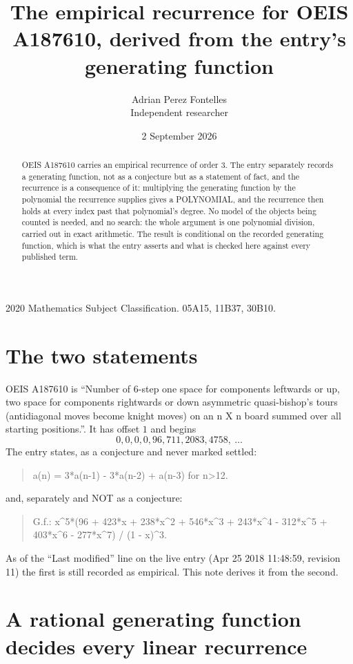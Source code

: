 \documentclass[11pt,a4paper]{article}
\title{The empirical recurrence for OEIS A187610, derived from the entry's generating function}
\author{Adrian Perez Fontelles\\ \small Independent researcher}
\date{2 September 2026}
\theoremstyle{plain}
\theoremstyle{definition}
\begin{document}
\maketitle

\begin{abstract}
OEIS A187610 carries an empirical recurrence of order $3$. The entry separately records a
generating function, not as a conjecture but as a statement of fact, and the recurrence is a
consequence of it: multiplying the generating function by the polynomial the recurrence
supplies gives a POLYNOMIAL, and the recurrence then holds at every index past that
polynomial's degree. No model of the objects being counted is needed, and no search: the
whole argument is one polynomial division, carried out in exact arithmetic. The result is
conditional on the recorded generating function, which is what the entry asserts and what is
checked here against every published term.
\end{abstract}

\noindent\small 2020 Mathematics Subject Classification. 05A15, 11B37, 30B10.\normalsize

\section{The two statements}

OEIS A187610 is ``Number of 6-step one space for components leftwards or up, two space for components rightwards or down asymmetric quasi-bishop's tours (antidiagonal moves become knight moves) on an n X n board summed over all starting positions.''. It has offset $1$ and begins
\[
0, 0, 0, 0, 96, 711, 2083, 4758,\ \dots
\]
The entry states, as a conjecture and never marked settled:
\begin{quote}
a(n) = 3*a(n-1) - 3*a(n-2) + a(n-3) for n>12.
\end{quote}
and, separately and NOT as a conjecture:
\begin{quote}
G.f.: x\^{}5*(96 + 423*x + 238*x\^{}2 + 546*x\^{}3 + 243*x\^{}4 - 312*x\^{}5 + 403*x\^{}6 - 277*x\^{}7) / (1 - x)\^{}3.
\end{quote}
As of the ``Last modified'' line on the live entry (Apr 25 2018 11:48:59, revision 11) the first is still
recorded as empirical. This note derives it from the second.

\section{A rational generating function decides every linear recurrence}
\end{document}

